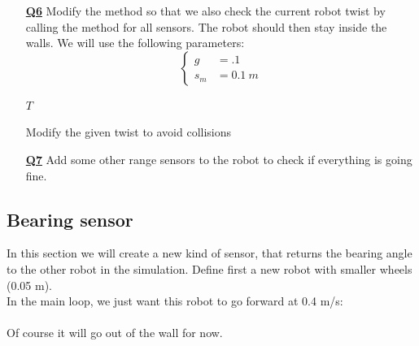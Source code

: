 \documentclass{ecnreport}
\begin{document}
\begin{itemize}
\medskip\item[\textbf{\underline{Q6}}] Modify the  method so that we also check the current robot twist by calling the  method for all sensors. The robot should then stay inside the walls. We will use the following parameters:
\begin{equation*}
\left\{\begin{array}{ll}
g &= .1 \\
s_m &= 0.1~ m
\end{array}\right.
\end{equation*}

\begin{algorithm}[!h]
{}
\Return $T$
\caption{Modify the given twist to avoid collisions}
\label{algo:range}
\end{algorithm}
\medskip\item[\textbf{\underline{Q7}}] Add some other range sensors to the robot to check if everything is going fine.
\end{itemize}



\newpage

\subsection{Bearing sensor}

In this section we will create a new kind of sensor, that returns the bearing angle to the other robot in the simulation.
Define first a new robot with smaller wheels (0.05 m). \\
In the main loop, we just want this robot to go forward at 0.4 m/s: \\\\
Of course it will go out of the wall for now.
\end{document}
